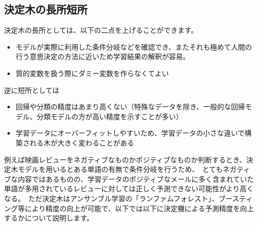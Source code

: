 \documentclass[uplatex]{jsarticle}
\begin{document}
\subsection{決定木の長所短所}
決定木の長所としては、以下の二点を上げることができます。
\begin{itemize}
  \item モデルが実際に利用した条件分岐などを確認でき、またそれも極めて人間の行う意思決定の方法に近いため学習結果の解釈が容易。
  \item 質的変数を扱う際にダミー変数を作らなくてよい
\end{itemize}
逆に短所としては
\begin{itemize}
  \item 回帰や分類の精度はあまり高くない（特殊なデータを除き、一般的な回帰モデル、分類モデルの方が高い精度を示すことが多い）
  \item 学習データにオーバーフィットしやすいため、学習データの小さな違いで構築される木が大きく変わることがある
\end{itemize}
例えば映画レビューをネガティブなものかポジティブなものか判断するとき、決定木モデルを用いるとある単語の有無で条件分岐を行うため、\
とてもネガティブな内容ではあるものの、学習データのポジティブなメールに多く含まれていた単語が多用されているレビューに対しては正しく予測できない可能性がより高くなる。\
ただ決定木はアンサンブル学習の「ランファムフォレスト」、ブースティング等により精度の向上が可能で、以下では以下に決定機による予測精度を向上するかについて説明します。
\end{document}
